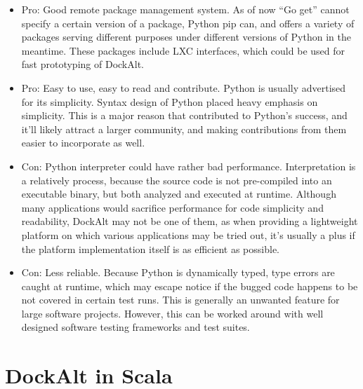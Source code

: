 \documentclass[letterpaper,twocolumn,10pt]{article}
\begin{document}
\begin{itemize}
\item Pro: Good remote package management system. As of now ``Go get'' cannot specify a certain version of a package, Python pip can, and offers a variety of packages serving different purposes under different versions of Python in the meantime. These packages include LXC interfaces, which could be used for fast prototyping of DockAlt.
\item Pro: Easy to use, easy to read and contribute. Python is usually advertised for its simplicity. Syntax design of Python placed heavy emphasis on simplicity. This is a major reason that contributed to Python's success, and it'll likely attract a larger community, and making contributions from them easier to incorporate as well.
\item Con: Python interpreter could have rather bad performance. Interpretation is a relatively process, because the source code is not pre-compiled into an executable binary, but both analyzed and executed at runtime. Although many applications would sacrifice performance for code simplicity and readability, DockAlt may not be one of them, as when providing a lightweight platform on which various applications may be tried out, it's usually a plus if the platform implementation itself is as efficient as possible.
\item Con: Less reliable. Because Python is dynamically typed, type errors are caught at runtime, which may escape notice if the bugged code happens to be not covered in certain test runs. This is generally an unwanted feature for large software projects. However, this can be worked around with well designed software testing frameworks and test suites.
\end{itemize}

\section{DockAlt in Scala}
\end{document}
